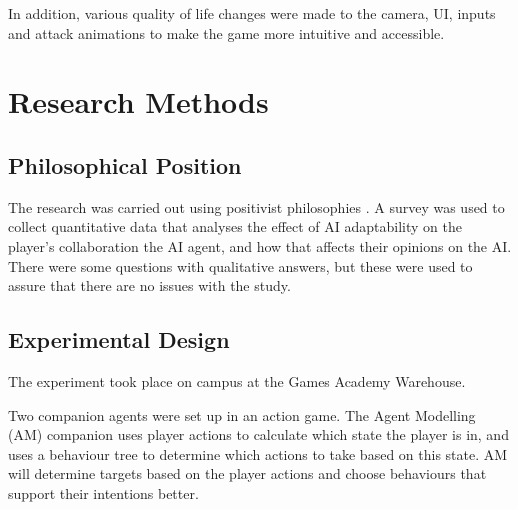 \documentclass{IEEEtran}
\begin{document}
In addition, various quality of life changes were made to the camera, UI, inputs and attack animations to make the game more intuitive and accessible.

\section{Research Methods}
\label{ResearchMethod}

\subsection{Philosophical Position}
\label{PhilosophicalPosition}



The research was carried out using positivist philosophies \cite{Zukauskas18}. A survey was used to collect quantitative data that analyses the effect of AI adaptability on the player's collaboration the AI agent, and how that affects their opinions on the AI. There were some questions with qualitative answers, but these were used to assure that there are no issues with the study.

\subsection{Experimental Design}
\label{ExperimentalDesign}



The experiment took place on campus at the Games Academy Warehouse.

Two companion agents were set up in an action game. The Agent Modelling (AM) companion uses player actions to calculate which state the player is in, and uses a behaviour tree to determine which actions to take based on this state. AM will determine targets based on the player actions and choose behaviours that support their intentions better.
\end{document}
